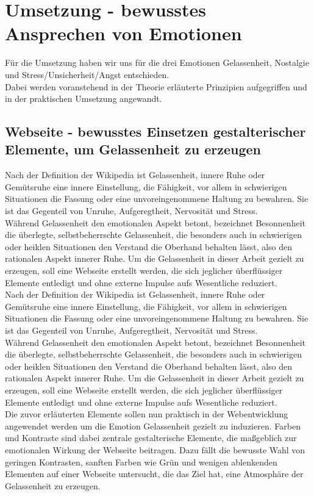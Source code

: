 \documentclass[./dokumentation.tex]{subfiles}
\begin{document}
\chapter{Umsetzung - bewusstes Ansprechen von Emotionen}
Für die Umsetzung haben wir uns für die drei Emotionen Gelassenheit, Nostalgie und Stress/Unsicherheit/Angst entschieden.\\ 
Dabei werden voranstehend in der Theorie erläuterte Prinzipien aufgegriffen und in der praktischen Umsetzung angewandt.

\section{Webseite - bewusstes Einsetzen gestalterischer Elemente, um Gelassenheit zu erzeugen}
Nach der Definition der Wikipedia ist Gelassenheit, innere Ruhe oder Gemütsruhe eine innere Einstellung, die Fähigkeit, vor allem in schwierigen Situationen die Fassung oder eine unvoreingenommene Haltung zu bewahren. Sie ist das Gegenteil von Unruhe, Aufgeregtheit, Nervosität und Stress.\\
Während Gelassenheit den emotionalen Aspekt betont, bezeichnet Besonnenheit die überlegte, selbstbeherrschte Gelassenheit, die besonders auch in schwierigen oder heiklen Situationen den Verstand die Oberhand behalten lässt, also den rationalen Aspekt innerer Ruhe.
Um die Gelassenheit in dieser Arbeit gezielt zu erzeugen, soll eine Webseite erstellt werden, die sich jeglicher überflüssiger Elemente entledigt und ohne externe Impulse aufs Wesentliche reduziert.\\
Nach der Definition der Wikipedia ist Gelassenheit, innere Ruhe oder Gemütsruhe eine innere Einstellung, die Fähigkeit, vor allem in schwierigen Situationen die Fassung oder eine unvoreingenommene Haltung zu bewahren. Sie ist das Gegenteil von Unruhe, Aufgeregtheit, Nervosität und Stress. \\
Während Gelassenheit den emotionalen Aspekt betont, bezeichnet Besonnenheit die überlegte, selbstbeherrschte Gelassenheit, die besonders auch in schwierigen oder heiklen Situationen den Verstand die Oberhand behalten lässt, also den rationalen Aspekt innerer Ruhe.
Um die Gelassenheit in dieser Arbeit gezielt zu erzeugen, soll eine Webseite erstellt werden, die sich jeglicher überflüssiger Elemente entledigt und ohne externe Impulse aufs Wesentliche reduziert.\\
Die zuvor erläuterten Elemente sollen nun praktisch in der Webentwicklung angewendet werden um die Emotion Gelassenheit gezielt zu induzieren. Farben und Kontraste sind dabei zentrale gestalterische Elemente, die maßgeblich zur emotionalen Wirkung der Webseite beitragen. Dazu fällt die bewusste Wahl von geringen Kontrasten, sanften Farben wie Grün und wenigen ablenkenden Elementen auf einer Webseite untersucht, die das Ziel hat, eine Atmosphäre der Gelassenheit zu erzeugen. \\
\end{document}
